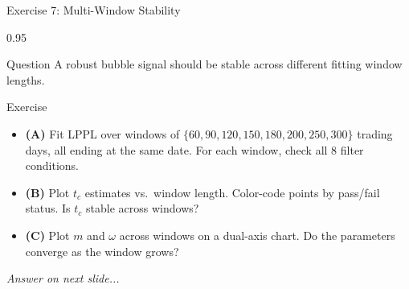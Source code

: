 \documentclass[9pt, aspectratio=169, t]{beamer}
\begin{document}
\begin{frame}{Exercise 7: Multi-Window Stability}
    \begin{cminipage}{0.95\textwidth}
    \begin{alertblock}{Question}
        A robust bubble signal should be stable across different fitting window lengths.
    \end{alertblock}

    \vspace{0.2cm}

    \begin{block}{Exercise}
        \begin{itemize}\setlength{\itemsep}{3pt}
            \item \textcolor{MainBlue}{\textbf{(A)}} Fit LPPL over windows of $\{60, 90, 120, 150, 180, 200, 250, 300\}$ trading days, all ending at the same date. For each window, check all 8 filter conditions.
            \item \textcolor{MainBlue}{\textbf{(B)}} Plot $t_c$ estimates vs.\ window length. Color-code points by pass/fail status. Is $t_c$ stable across windows?
            \item \textcolor{MainBlue}{\textbf{(C)}} Plot $m$ and $\omega$ across windows on a dual-axis chart. Do the parameters converge as the window grows?
        \end{itemize}
    \end{block}

    \vspace{0.2cm}

    \begin{center}
        \textit{Answer on next slide...}
    \end{center}
    \end{cminipage}
\end{frame}
\end{document}
